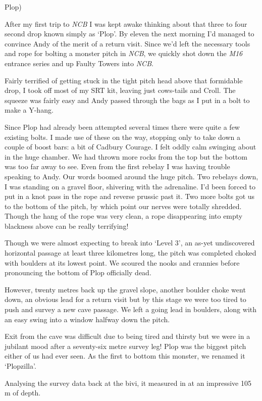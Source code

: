 Plop)

After my first trip to \emph{NCB} I was kept awake thinking about that
three to four second drop known simply as `Plop'. By eleven the next
morning I'd managed to convince Andy of the merit of a return visit.
Since we'd left the necessary tools and rope for bolting a monster pitch
in \emph{NCB}, we quickly shot down the \emph{M16} entrance series and
up Faulty Towers into \emph{NCB}.

Fairly terrified of getting stuck in the tight pitch head above that
formidable drop, I took off most of my SRT kit, leaving just cows-tails
and Croll. The squeeze was fairly easy and Andy passed through the bags
as I put in a bolt to make a Y-hang.

Since Plop had already been attempted several times there were quite a
few existing bolts. I made use of these on the way, stopping only to
take down a couple of boost bars: a bit of Cadbury Courage. I felt oddly
calm swinging about in the huge chamber. We had thrown more rocks from
the top but the bottom was too far away to see. Even from the first
rebelay I was having trouble speaking to Andy. Our words boomed around
the huge pitch. Two rebelays down, I was standing on a gravel floor,
shivering with the adrenaline. I'd been forced to put in a knot pass in
the rope and reverse prussic past it. Two more bolts got us to the
bottom of the pitch, by which point our nerves were totally shredded.
Though the hang of the rope was very clean, a rope disappearing into
empty blackness above can be really terrifying!

Though we were almost expecting to break into `Level 3', an as-yet
undiscovered horizontal passage at least three kilometres long, the
pitch was completed choked with boulders at its lowest point. We scoured
the nooks and crannies before pronouncing the bottom of Plop officially
dead.

However, twenty metres back up the gravel slope, another boulder choke
went down, an obvious lead for a return visit but by this stage we were
too tired to push and survey a new cave passage. We left a going lead in
boulders, along with an easy swing into a window halfway down the pitch.

Exit from the cave was difficult due to being tired and thirsty but we
were in a jubilant mood after a seventy-six metre survey leg! Plop was
the biggest pitch either of us had ever seen. As the first to bottom
this monster, we renamed it `Plopzilla'.

Analysing the survey data back at the bivi, it measured in at an
impressive 105 m of depth.


